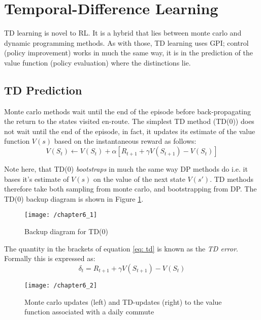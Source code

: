\section{Temporal-Difference Learning}

TD learning is novel to RL. It is a hybrid that lies between monte carlo and dynamic programming methods. As with those, TD learning uses GPI; control (policy improvement) works in much the same way, it is in the prediction of the value function (policy evaluation) where the distinctions lie.

\subsection{TD Prediction}
Monte carlo methods wait until the end of the episode before back-propagating the return to the states visited en-route. The simplest TD method (TD(0)) does not wait until the end of the episode, in fact, it updates its estimate of the value function $V(s)$ based on the instantaneous reward as follows:
\begin{equation} \label{eq: td}
V(S_t) \leftarrow V(S_t) + \alpha \left[R_{t+1} + \gamma V(S_{t+1}) - V(S_t)\right]
\end{equation}

Note here, that TD(0) \textit{bootstraps} in much the same way DP methods do i.e. it bases it's estimate of $V(s)$ on the value of the next state $V(s')$. TD methods therefore take both sampling from monte carlo, and bootstrapping from DP. The TD(0) backup diagram is shown in Figure \ref{fig:td(0)}.

\begin{figure}[h!]
	\centering
	\texttt{[image: /chapter6\_1]}
	\caption{Backup diagram for TD(0)}
	\label{fig:td(0)}
\end{figure}

The quantity in the brackets of equation \ref{eq: td} is known as the \textit{TD error}. Formally this is expressed as:
\begin{equation}
\delta_t = R_{t+1} + \gamma V(S_{t+1}) - V(S_t)
\end{equation}

\begin{figure}[h!]
	\centering
	\texttt{[image: /chapter6\_2]}
	\caption{Monte carlo updates (left) and TD-updates (right) to the value function associated with a daily commute}
	\label{fig:td vs. mc}
\end{figure}

